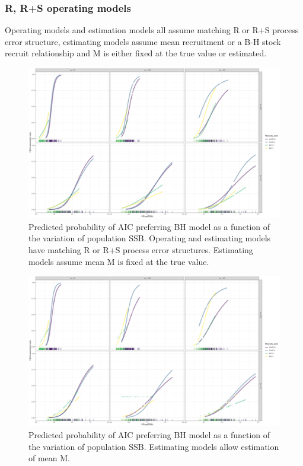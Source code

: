 \documentclass[
  12pt,
]{article}
\begin{document}
\hypertarget{r-rs-operating-models-1}{%
\subsubsection{R, R+S operating models}\label{r-rs-operating-models-1}}

\begin{table}
\caption{Operating models and estimation models all assume matching R or R+S process error structure, estimating models assume mean recruitment or a B-H stock recruit relationship and M is either fixed at the true value or estimated.}
{}
\end{table}

\begin{figure}
\caption{Predicted probability of AIC preferring BH model as a function of the variation of population SSB. Operating and estimating models have matching R or R+S process error structures. Estimating models assume mean M is fixed at the true value.}\label{naa_om_MF_BH_glm_AIC_plots}
\begin{center}
\includegraphics[width = \textwidth]{naa_om_MF_pred_BH_best.png}
\end{center}
\end{figure}

\begin{figure}
\caption{Predicted probability of AIC preferring BH model as a function of the variation of population SSB. Estimating models allow estimation of mean M.}\label{naa_om_ME_BH_glm_AIC_plots}
\begin{center}
\includegraphics[width = \textwidth]{naa_om_ME_pred_BH_best.png}
\end{center}
\end{figure}
\end{document}
